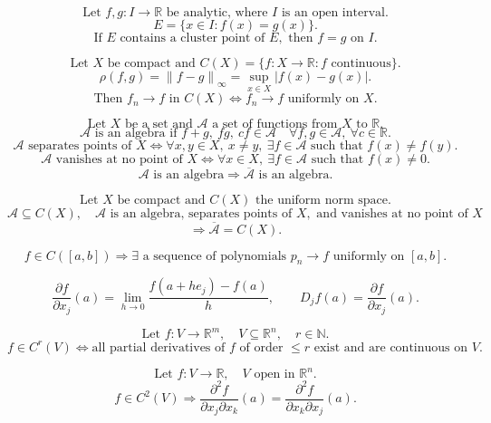 \documentclass[11pt]{article}
\newcommand{\R}{\mathbb R}
\newcommand{\N}{\mathbb N}
\newcommand{\norm}[1]{\left\lVert #1\right\rVert}
\begin{document}
\[
\text{Let }f,g:I\to\R\text{ be analytic, where }I\text{ is an open interval.}
\]
\[
E=\{x\in I:f(x)=g(x)\}.
\]
\[
\text{If }E\text{ contains a cluster point of }E,\text{ then }f=g\text{ on }I.
\]

\newpage


\[
\text{Let }X\text{ be compact and }C(X)=\{f:X\to\R:f\text{ continuous}\}.
\]
\[
\rho(f,g)=\norm{f-g}_\infty=\sup_{x\in X}|f(x)-g(x)|.
\]
\[
\text{Then }f_n\to f\text{ in }C(X)
\Longleftrightarrow f_n\to f\text{ uniformly on }X.
\]

\[
\text{Let }X\text{ be a set and }\mathcal A\text{ a set of functions from }X\text{ to }\R.
\]
\[
\mathcal A\text{ is an algebra if }f+g,\ fg,\ cf\in\mathcal A
\quad \forall f,g\in\mathcal A,\ \forall c\in\R.
\]
\[
\mathcal A\text{ separates points of }X
\Longleftrightarrow
\forall x,y\in X,\ x\ne y,\ \exists f\in\mathcal A\text{ such that }f(x)\ne f(y).
\]
\[
\mathcal A\text{ vanishes at no point of }X
\Longleftrightarrow
\forall x\in X,\ \exists f\in\mathcal A\text{ such that }f(x)\ne0.
\]
\[
\mathcal A\text{ is an algebra}\Longrightarrow\overline{\mathcal A}\text{ is an algebra.}
\]

\[
\text{Let }X\text{ be compact and }C(X)\text{ the uniform norm space.}
\]
\[
\mathcal A\subseteq C(X),\quad
\mathcal A\text{ is an algebra, separates points of }X,\text{ and vanishes at no point of }X
\]
\[
\Longrightarrow
\overline{\mathcal A}=C(X).
\]

\[
f\in C([a,b])
\Longrightarrow
\exists\text{ a sequence of polynomials }p_n\to f\text{ uniformly on }[a,b].
\]

\newpage


\[
\frac{\partial f}{\partial x_j}(a)
=\lim_{h\to0}\frac{f(a+he_j)-f(a)}{h},
\qquad
D_jf(a)=\frac{\partial f}{\partial x_j}(a).
\]

\[
\text{Let }f:V\to\R^m,\quad V\subseteq\R^n,\quad r\in\N.
\]
\[
f\in C^r(V)\Longleftrightarrow
\text{all partial derivatives of }f\text{ of order }\le r
\text{ exist and are continuous on }V.
\]

\[
\text{Let }f:V\to\R,\quad V\text{ open in }\R^n.
\]
\[
f\in C^2(V)\Longrightarrow
\frac{\partial^2 f}{\partial x_j\partial x_k}(a)
=
\frac{\partial^2 f}{\partial x_k\partial x_j}(a).
\]
\end{document}
